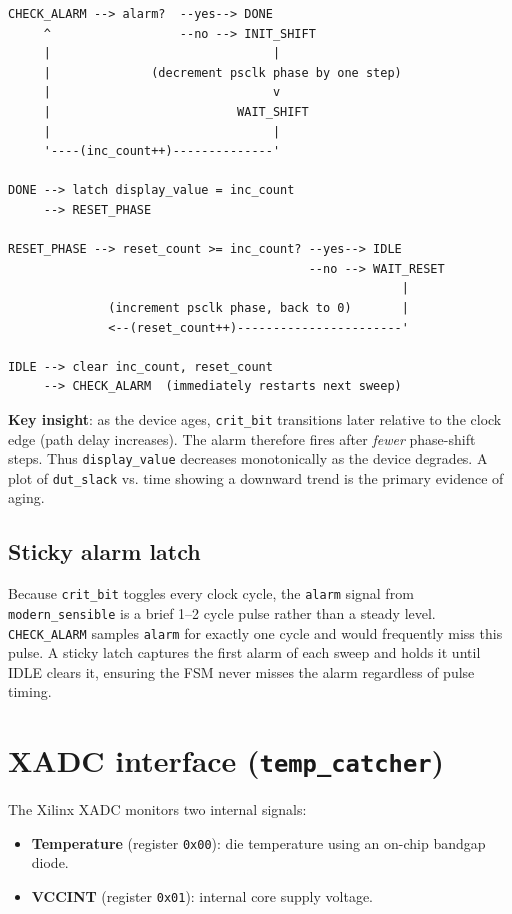 \documentclass[12pt, a4paper]{report}
\begin{document}
\begin{lstlisting}[style=shell, caption={FSM state diagram}]
CHECK_ALARM --> alarm?  --yes--> DONE
     ^                  --no --> INIT_SHIFT
     |                               |
     |              (decrement psclk phase by one step)
     |                               v
     |                          WAIT_SHIFT
     |                               |
     '----(inc_count++)--------------'

DONE --> latch display_value = inc_count
     --> RESET_PHASE

RESET_PHASE --> reset_count >= inc_count? --yes--> IDLE
                                          --no --> WAIT_RESET
                                                       |
              (increment psclk phase, back to 0)       |
              <--(reset_count++)-----------------------'

IDLE --> clear inc_count, reset_count
     --> CHECK_ALARM  (immediately restarts next sweep)
\end{lstlisting}

\textbf{Key insight}: as the device ages, \texttt{crit\_bit} transitions later relative
to the clock edge (path delay increases). The alarm therefore fires after \emph{fewer}
phase-shift steps. Thus \texttt{display\_value} decreases monotonically as the device
degrades. A plot of \texttt{dut\_slack} vs. time showing a downward trend is the
primary evidence of aging.

\subsection{Sticky alarm latch}

Because \texttt{crit\_bit} toggles every clock cycle, the \texttt{alarm} signal from
\texttt{modern\_sensible} is a brief 1--2 cycle pulse rather than a steady level.
\texttt{CHECK\_ALARM} samples \texttt{alarm} for exactly one cycle and would frequently
miss this pulse. A sticky latch captures the first alarm of each sweep and holds it
until IDLE clears it, ensuring the FSM never misses the alarm regardless of pulse
timing.

\section{XADC interface (\texttt{temp\_catcher})}

The Xilinx XADC monitors two internal signals:
\begin{itemize}
  \item \textbf{Temperature} (register \texttt{0x00}): die temperature using an on-chip bandgap diode.
  \item \textbf{VCCINT} (register \texttt{0x01}): internal core supply voltage.
\end{itemize}
\end{document}
